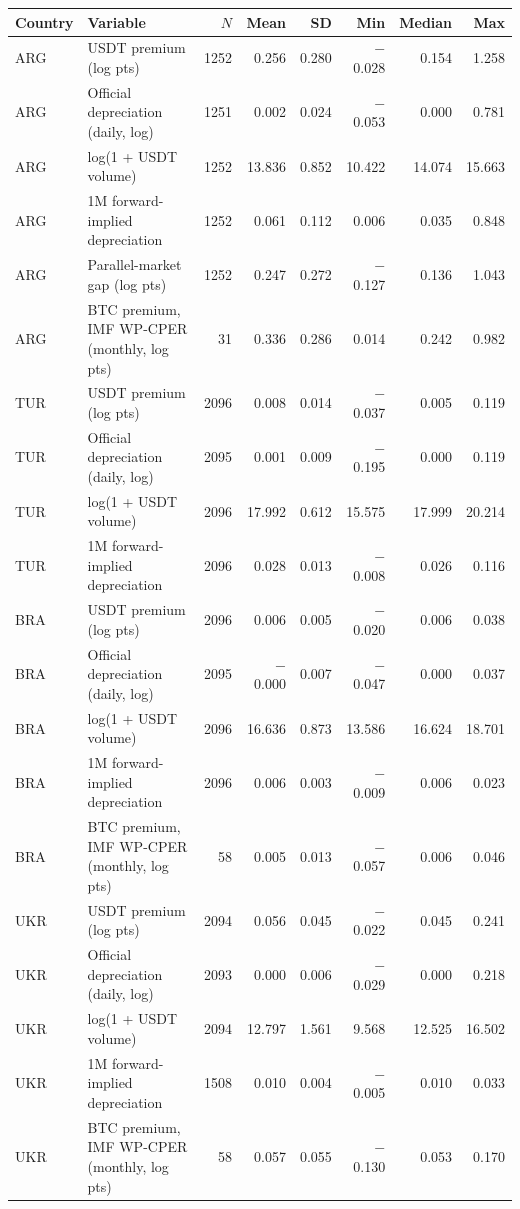 \begin{tabular}{llrrrrrr}
\toprule
Country & Variable & $N$ & Mean & SD & Min & Median & Max \\
\midrule
ARG & USDT premium (log pts) & 1252 & 0.256 & 0.280 & $-$0.028 & 0.154 & 1.258 \\
ARG & Official depreciation (daily, log) & 1251 & 0.002 & 0.024 & $-$0.053 & 0.000 & 0.781 \\
ARG & log(1 + USDT volume) & 1252 & 13.836 & 0.852 & 10.422 & 14.074 & 15.663 \\
ARG & 1M forward-implied depreciation & 1252 & 0.061 & 0.112 & 0.006 & 0.035 & 0.848 \\
ARG & Parallel-market gap (log pts) & 1252 & 0.247 & 0.272 & $-$0.127 & 0.136 & 1.043 \\
ARG & BTC premium, IMF WP-CPER (monthly, log pts) & 31 & 0.336 & 0.286 & 0.014 & 0.242 & 0.982 \\
TUR & USDT premium (log pts) & 2096 & 0.008 & 0.014 & $-$0.037 & 0.005 & 0.119 \\
TUR & Official depreciation (daily, log) & 2095 & 0.001 & 0.009 & $-$0.195 & 0.000 & 0.119 \\
TUR & log(1 + USDT volume) & 2096 & 17.992 & 0.612 & 15.575 & 17.999 & 20.214 \\
TUR & 1M forward-implied depreciation & 2096 & 0.028 & 0.013 & $-$0.008 & 0.026 & 0.116 \\
BRA & USDT premium (log pts) & 2096 & 0.006 & 0.005 & $-$0.020 & 0.006 & 0.038 \\
BRA & Official depreciation (daily, log) & 2095 & $-$0.000 & 0.007 & $-$0.047 & 0.000 & 0.037 \\
BRA & log(1 + USDT volume) & 2096 & 16.636 & 0.873 & 13.586 & 16.624 & 18.701 \\
BRA & 1M forward-implied depreciation & 2096 & 0.006 & 0.003 & $-$0.009 & 0.006 & 0.023 \\
BRA & BTC premium, IMF WP-CPER (monthly, log pts) & 58 & 0.005 & 0.013 & $-$0.057 & 0.006 & 0.046 \\
UKR & USDT premium (log pts) & 2094 & 0.056 & 0.045 & $-$0.022 & 0.045 & 0.241 \\
UKR & Official depreciation (daily, log) & 2093 & 0.000 & 0.006 & $-$0.029 & 0.000 & 0.218 \\
UKR & log(1 + USDT volume) & 2094 & 12.797 & 1.561 & 9.568 & 12.525 & 16.502 \\
UKR & 1M forward-implied depreciation & 1508 & 0.010 & 0.004 & $-$0.005 & 0.010 & 0.033 \\
UKR & BTC premium, IMF WP-CPER (monthly, log pts) & 58 & 0.057 & 0.055 & $-$0.130 & 0.053 & 0.170 \\
\bottomrule
\end{tabular}
